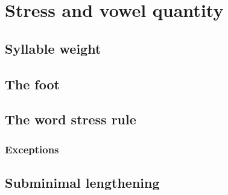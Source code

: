 \chapter{Stress and vowel quantity}

\section{Syllable weight}

\section{The foot}

\section{The word stress rule}

\subsection{Exceptions}

\section{Subminimal lengthening}
